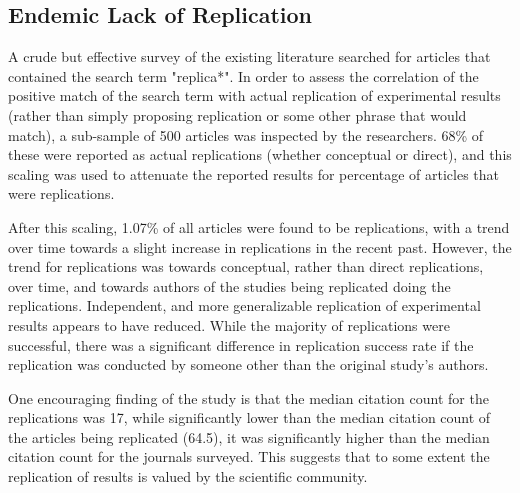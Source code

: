 \documentclass[12pt,a4paper,titlepage]{scrreprt}
\begin{document}
\subsection{Endemic Lack of Replication}

A crude but effective survey of the existing literature searched for articles that contained the search term "replica*"\cite{makel_replications_2012}. In order to assess the correlation of the positive match of the search term with actual replication of experimental results (rather than simply proposing replication or some other phrase that would match), a sub-sample of 500 articles was inspected by the researchers. 68\% of these were reported as actual replications (whether conceptual or direct), and this scaling was used to attenuate the reported results for percentage of articles that were replications.

After this scaling, 1.07\% of all articles were found to be replications, with a trend over time towards a slight increase in replications in the recent past. However, the trend for replications was towards conceptual, rather than direct replications, over time, and towards authors of the studies being replicated doing the replications. Independent, and more generalizable replication of experimental results appears to have reduced.
While the majority of replications were successful, there was a significant difference in replication success rate if the replication was conducted by someone other than the original study's authors.

One encouraging finding of the study is that the median citation count for the replications was 17, while significantly lower than the median citation count of the articles being replicated (64.5), it was significantly higher than the median citation count for the journals surveyed. This suggests that to some extent the replication of results is valued by the scientific community.
\end{document}
